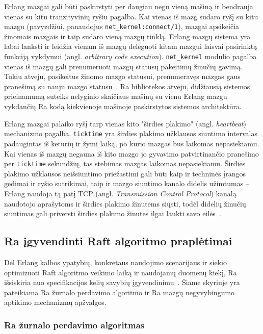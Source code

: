 \documentclass{VUMIFPSkursinis}
\begin{document}
Erlang mazgai gali būti paskirstyti per daugiau negu vieną mašiną ir bendrauja vienas su kitu tranzityvinių ryšiu pagalba. Kai vienas iš mazg sudaro ryšį su kitu mazgu (pavyzdžiui, panaudojus \texttt{net\_kernel:connect/1}), mazgai apsikeičia žinomais mazgais ir taip sudaro vieną mazgų tinklą. Erlang mazgų sistema yra labai lanksti ir leidžia vienam iš mazgų deleguoti kitam mazgui laisvai pasirinktą funkciją vykdymui (angl. \textit{arbitrary code execution}). \texttt{net\_kernel} modulio pagalba vienas iš mazgų gali prenumeruoti mazgų statusų pakeitimų žinučių gavimą. Tokiu atveju, pasikeitus žinomo mazgo statusui, prenumeravęs mazgas gaus pranešimą su nauju mazgo statusu~\cite{erlang_distributed, hebert_learn_2013}. Ra bibliotekos atveju, didžiausią sistemos prieinamumą suteiks nelyginio skaičiaus mašinų su vienu Erlang mazgu vykdančių Ra kodą kiekvienoje mašinoje paskirstytos sistemos architektūra.

Erlang mazgai palaiko ryšį tarp vienas kito "širdies plakimo" (angl. \emph{heartbeat}) mechanizmo pagalba. \texttt{ticktime} yra širdies plakimo užklausos siuntimo intervalas padaugintas iš keturių ir žymi laiką, po kurio mazgas bus laikomas nepasiekiamu. Kai vienas iš mazgų negauna iš kito mazgo jo gyvavimo patvirtinančio pranešimo per \texttt{ticktime} sekundžių, tas stebimas mazgas laikomas nepasiekiamu. Širdies plakimo užklausos neišsiuntimo priežastimi gali būti kaip ir techninės įrangos gedimai ir ryšio sutrikimai, taip ir mazgo siuntimo kanalo didelis užimtumas -- Erlang naudoja tą patį TCP (angl. \emph{Transmission Control Protocol}) kanalą naudotojo aprašytoms ir širdies plakimo žinutėms siųsti, todėl didelių žinučių siuntimas gali priversti širdies plakimo žinutes ilgai laukti savo eilės~\cite{hebert_learn_2013}.

\subsection{Ra įgyvendinti Raft algoritmo praplėtimai}

Dėl Erlang kalbos ypatybių, konkretaus naudojimo scenarijaus ir siekio optimizuoti Raft algoritmo veikimo laiką ir naudojamų duomenų kiekį, Ra išsiskiria nuo specifikacijos kelių savybių įgyvendinimu~\cite{rabbitmqra}. Šiame skyriuje yra pateikiama Ra žurnalo perdavimo algoritmo ir Ra mazgų negyvybingumo aptikimo mechanizmų apžvalgos. 

\subsubsection{Ra žurnalo perdavimo algoritmas}
\end{document}
